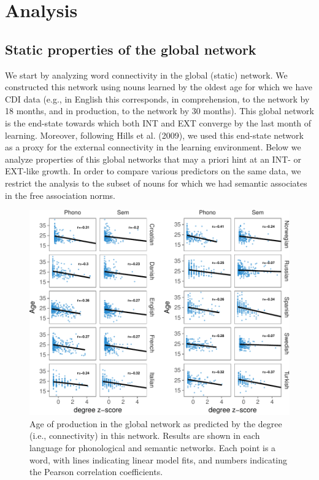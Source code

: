 \documentclass[english,floatsintext,man]{apa6}
\theoremstyle{definition}
\theoremstyle{definition}
\theoremstyle{definition}
\theoremstyle{remark}
\begin{document}
\section{Analysis}\label{analysis}

\subsection{Static properties of the global
network}\label{static-properties-of-the-global-network}

We start by analyzing word connectivity in the global (static) network.
We constructed this network using nouns learned by the oldest age for
which we have CDI data (e.g., in English this corresponds, in
comprehension, to the network by 18 months, and in production, to the
network by 30 months). This global network is the end-state towards
which both INT and EXT converge by the last month of learning. Moreover,
following Hills et al. (2009), we used this end-state network as a proxy
for the external connectivity in the learning environment. Below we
analyze properties of this global networks that may a priori hint at an
INT- or EXT-like growth. In order to compare various predictors on the
same data, we restrict the analysis to the subset of nouns for which we
had semantic associates in the free association norms.

\begin{figure}[!h]
\includegraphics[width=\textwidth]{ms_files/figure-latex/corrProd-1} \caption{Age of production in the global network as predicted by the degree (i.e., connectivity) in this network. Results are shown in each language for phonological and semantic networks. Each point is a word, with lines indicating linear model fits, and numbers indicating the Pearson correlation coefficients.}\label{fig:corrProd}
\end{figure}
\end{document}
